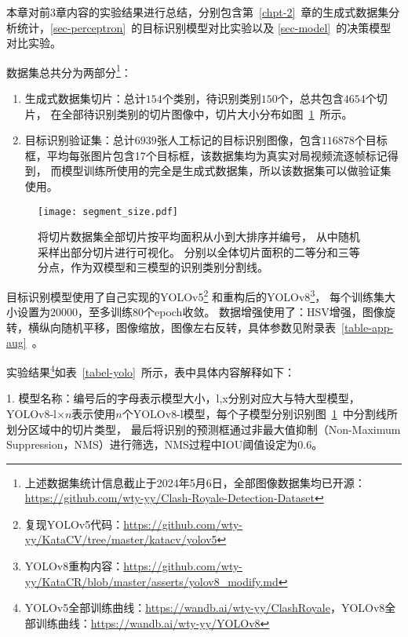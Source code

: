 
\label{sec-5}
本章对前3章内容的实验结果进行总结，分别包含第~\ref{chpt-2}~章的生成式数据集分析统计，\ref{sec-perceptron}~的目标识别模型对比实验以及
\ref{sec-model}~的决策模型对比实验。

\label{sec-exp-data}
数据集总共分为两部分\footnote{上述数据集统计信息截止于2024年5月6日，全部图像数据集均已开源：
\url{https://github.com/wty-yy/Clash-Royale-Detection-Dataset}}：
\begin{enumerate}
  \item 生成式数据集切片：总计$154$个类别，待识别类别$150$个，总共包含$4654$个切片，
  在全部待识别类别的切片图像中，切片大小分布如图~\ref{fig-segment}~所示。
  \item 目标识别验证集：总计$6939$张人工标记的目标识别图像，包含$116878$个目标框，平均每张图片包含17个目标框，该数据集均为真实对局视频流逐帧标记得到，
  而模型训练所使用的完全是生成式数据集，所以该数据集可以做验证集使用。
\end{enumerate}

\begin{figure}[htbp]
  \centering
  \texttt{[image: segment\_size.pdf]}
  \caption{将切片数据集全部切片按平均面积从小到大排序并编号，
  从中随机采样出部分切片进行可视化。
  分别以全体切片面积的二等分和三等分点，作为双模型和三模型的识别类别分割线。
  }
  \label{fig-segment}
\end{figure}

\label{sec-exp-detect}
目标识别模型使用了自己实现的YOLOv5\footnote{复现YOLOv5代码：\url{https://github.com/wty-yy/KataCV/tree/master/katacv/yolov5}}
和重构后的YOLOv8\footnote{YOLOv8重构内容：\url{https://github.com/wty-yy/KataCR/blob/master/asserts/yolov8_modify.md}}，
每个训练集大小设置为$20000$，至多训练$80$个epoch收敛。
数据增强使用了：HSV增强，图像旋转，横纵向随机平移，图像缩放，图像左右反转，具体参数见附录表~\ref{table-app-aug}~。

实验结果\footnote{YOLOv5全部训练曲线：\url{https://wandb.ai/wty-yy/ClashRoyale}，YOLOv8全部训练曲线：\url{https://wandb.ai/wty-yy/YOLOv8}}如表~\ref{tabel-yolo}~所示，表中具体内容解释如下：

1. 模型名称：编号后的字母表示模型大小，l,x分别对应大与特大型模型，
YOLOv8-l$\times n$表示使用$n$个YOLOv8-l模型，每个子模型分别识别图~\ref{fig-segment}~中分割线所划分区域中的切片类型，
最后将识别的预测框通过非最大值抑制（Non-Maximum Suppression，NMS）进行筛选，NMS过程中IOU阈值设定为0.6。

